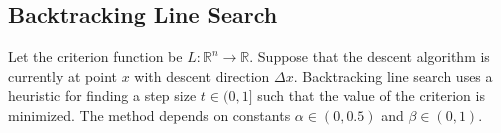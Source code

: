 \documentclass[12pt,letterpaper]{article}
\begin{document}

\subsection{Backtracking Line Search}

Let the criterion function be $L:\mathbb{R}^n \rightarrow \mathbb{R}$. Suppose that the descent algorithm is currently at point $x$ with descent direction $\Delta x$. Backtracking line search uses a heuristic for finding a step size $t \in (0,1]$ such that the value of the criterion is minimized. The method depends on constants $\alpha  \in (0, 0.5)$ and $\beta \in (0,1)$.
\end{document}
